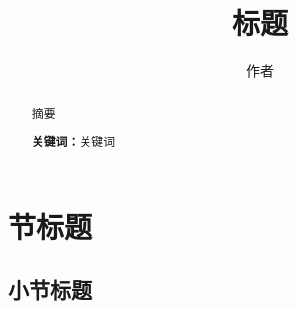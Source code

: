\documentclass{solitairemiya-art}
\title{标题}
\author{作者}
\begin{document}
\maketitle

\begin{abstract}
    摘要

    \noindent\textbf{关键词：}\songti{}关键词
\end{abstract}


\section{节标题}
\subsection{小节标题}
\end{document}
